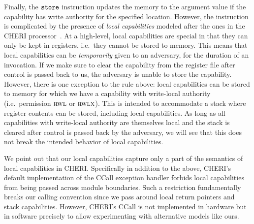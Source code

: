 \documentclass[format=acmsmall, review=true, screen=true]{acmart}
\newcommand\dominique[1]{{\color{purple} \sf \footnotesize {DD: #1}}\\}
\renewcommand\dominique[1]{}
\newcommand{\zinstr}[1]{\mathtt{#1}}
\newcommand{\twoinstr}[3]{
  \ifthenelse{\equal{#2#3}{}}
  {\zinstr{#1}}
  {\zinstr{#1} \; #2 \; #3}
}
\newcommand{\store}[2]{\twoinstr{store}{#1}{#2}}
\newcommand{\plainperm}[1]{\textsc{#1}}
\newcommand{\readwritel}{\plainperm{rwl}}
\newcommand{\rwl}{\readwritel}
\newcommand{\rwlx}{\plainperm{rwlx}}
\begin{document}
Finally, the $\store{}{}$ instruction updates the memory to the argument value
if the capability has write authority for the specified location. However, the
instruction is complicated by the presence of \emph{local capabilities} modeled
after the ones in the CHERI processor~\citep{Watson2015Cheri}. At a high-level, local
capabilities are special in that they can only be kept in registers, i.e.\, they
cannot be stored to memory. This means that local capabilities can be
\emph{temporarily} given to an adversary, for the duration of an invocation. If
we make sure to clear the capability from the register file after control is
passed back to us, the adversary is unable to store the capability.
However, there is one exception to the rule above: local capabilities can be
stored to memory for which we have a capability with write-local authority
(i.e.\ permission $\rwl$ or $\rwlx$). This is intended to accommodate a stack
where register contents can be stored, including local capabilities. As long as
all capabilities with write-local authority are themselves local and the stack
is cleared after control is passed back by the adversary, we will see that this
does not break the intended behavior of local capabilities.

We point out that our local capabilities capture only a part of the semantics of
local capabilities in CHERI. Specifically in addition to the above, CHERI's
default implementation of the CCall exception handler forbids local capabilities
from being passed across module boundaries. Such a restriction fundamentally
breaks our calling convention since we pass around local return pointers and
stack capabilities. However, CHERI's CCall is not implemented in hardware but
in software precisely to allow experimenting with alternative models like ours.
\dominique{Update to CHERI's new ccall story.}

\end{document}
